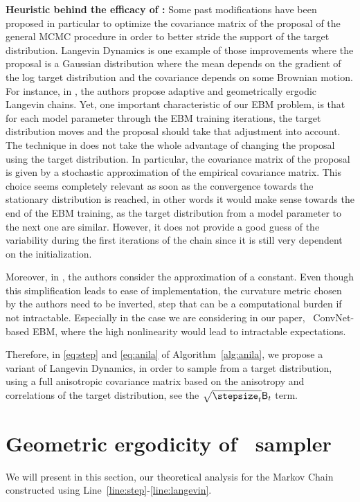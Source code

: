\documentclass[10pt,twocolumn,letterpaper]{article}
\begin{document}
\textbf{Heuristic behind the efficacy of \algo:}
Some past modifications have been proposed in particular to optimize the covariance matrix of the proposal of the general MCMC procedure in order to better stride the support of the target distribution. 
Langevin Dynamics is one example of those improvements where the proposal is a Gaussian distribution where the mean depends on the gradient of the log target distribution and the covariance depends on some Brownian motion.
For instance, in \cite{atchade2006adaptive,marshall2012adaptive}, the authors propose adaptive and geometrically ergodic Langevin chains. 
Yet, one important characteristic of our EBM problem, is that for each model parameter through the EBM training iterations, the target distribution moves and the proposal should take that adjustment into account.
The technique in \cite{atchade2006adaptive,marshall2012adaptive} does not take the whole advantage of changing the proposal using the target distribution. 
In particular, the covariance matrix of the proposal is given by a stochastic approximation of the empirical covariance matrix. 
This choice seems completely relevant as soon as the convergence towards the stationary distribution is reached, in other words it would make sense towards the end of the EBM training, as the target distribution from a model parameter to the next one are similar. 
However, it does not provide a good guess of the variability during the first iterations of the chain since it is still very dependent on the initialization. 

Moreover, in  \cite{girolami2011riemann}, the authors consider the approximation of a constant. Even though this simplification leads to ease of implementation, the curvature metric chosen by the authors need to be inverted, step that can be a computational burden if not intractable. 
Especially in the case we are considering in our paper, \ie\ ConvNet-based EBM, where the high nonlinearity would lead to intractable expectations.

Therefore, in \eqref{eq:step} and \eqref{eq:anila} of Algorithm~\ref{alg:anila}, we propose a variant of Langevin Dynamics, in order to sample from a target distribution, using a full anisotropic covariance matrix based on the anisotropy and correlations of the target distribution, see the $\sqrt{\stepsize_t} \mathsf{B}_t$ term. 


\section{Geometric ergodicity of \algo\ sampler}\label{sec:theory}
We will present in this section, our theoretical analysis for the Markov Chain constructed using Line~\ref{line:step}-\ref{line:langevin}. 
\end{document}
